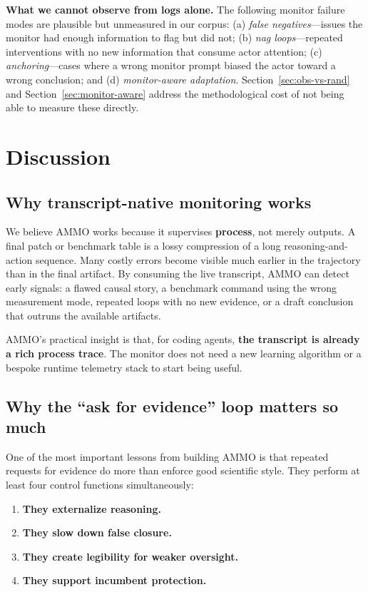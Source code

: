 \documentclass[11pt]{article}
\begin{document}
\textbf{What we cannot observe from logs alone.} The following monitor failure modes are plausible but unmeasured in our corpus: (a) \emph{false negatives}---issues the monitor had enough information to flag but did not; (b) \emph{nag loops}---repeated interventions with no new information that consume actor attention; (c) \emph{anchoring}---cases where a wrong monitor prompt biased the actor toward a wrong conclusion; and (d) \emph{monitor-aware adaptation}. Section~\ref{sec:obs-vs-rand} and Section~\ref{sec:monitor-aware} address the methodological cost of not being able to measure these directly.

\section{Discussion}

\subsection{Why transcript-native monitoring works}

We believe AMMO works because it supervises \textbf{process}, not merely outputs. A final patch or benchmark table is a lossy compression of a long reasoning-and-action sequence. Many costly errors become visible much earlier in the trajectory than in the final artifact. By consuming the live transcript, AMMO can detect early signals: a flawed causal story, a benchmark command using the wrong measurement mode, repeated loops with no new evidence, or a draft conclusion that outruns the available artifacts.

AMMO's practical insight is that, for coding agents, \textbf{the transcript is already a rich process trace}. The monitor does not need a new learning algorithm or a bespoke runtime telemetry stack to start being useful.

\subsection{Why the ``ask for evidence'' loop matters so much}

One of the most important lessons from building AMMO is that repeated requests for evidence do more than enforce good scientific style. They perform at least four control functions simultaneously:

\begin{enumerate}[leftmargin=*,itemsep=2pt]
  \item \textbf{They externalize reasoning.}
  \item \textbf{They slow down false closure.}
  \item \textbf{They create legibility for weaker oversight.}
  \item \textbf{They support incumbent protection.}
\end{enumerate}
\end{document}
